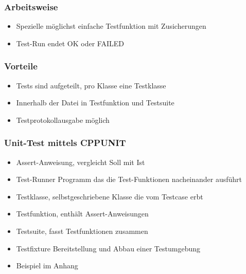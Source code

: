 \subsubsection{Arbeitsweise}
\begin{itemize}
	\item Spezielle möglichst einfache Testfunktion mit Zusicherungen
	\item Test-Run endet OK oder FAILED
\end{itemize}

\subsubsection{Vorteile}
\begin{itemize}
	\item Tests sind aufgeteilt, pro Klasse eine Testklasse
	\item Innerhalb der Datei in Testfunktion und Testsuite
	\item Testprotokollausgabe möglich 
\end{itemize}

\subsubsection{Unit-Test mittels CPPUNIT}
\begin{minipage}{15cm}
	\begin{itemize}
		\item Assert-Anweisung, vergleicht Soll mit Ist
		\item Test-Runner Programm das die Test-Funktionen nacheinander ausführt
		\item Testklasse, selbstgeschriebene Klasse die vom Testcase erbt
		\item Testfunktion, enthält Assert-Anweisungen
		\item Testsuite, fasst Testfunktionen zusammen
		\item Testfixture Bereitstellung und Abbau einer Testumgebung
		\item Beispiel im Anhang
	\end{itemize}
\end{minipage}
